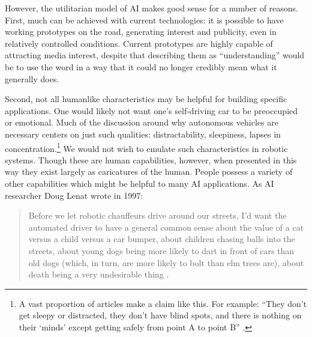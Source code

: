 


However, the utilitarian model of AI makes good sense for a number of reasons.
First, much can be achieved with current technologies:  it
is possible to have working prototypes on the road, generating
interest and publicity, even in relatively controlled conditions. Current
prototypes are highly capable of attracting media interest, despite
that describing them as 
``understanding'' would be to use the word in a way that it
could no longer credibly mean what it generally does. 

Second, not all humanlike characteristics may be helpful for building
specific applications. One would likely not want one's self-driving car
to be preoccupied or emotional. Much of the
discussion around why autonomous vehicles are necessary centers on
just such qualities: distractability, sleepiness, lapses in
concentration.\footnote{A vast proportion of articles make a claim
  like this. For example: ``They don't get sleepy or
  distracted, they don't have blind spots, and there is nothing on
  their `minds' except getting safely from point A to point B'' \cite{merrill}.} We
would not wish to emulate such 
characteristics in robotic systems. Though these are human
capabilities, however, when presented in this way they exist largely as caricatures
of the human. People possess a
variety of other capabilities which might be helpful to many AI
applications. As AI researcher Doug Lenat wrote in 1997:
\begin{quote}
Before we let robotic chauffeurs drive around our streets, I'd want the
  automated driver to have a general common sense about the value of a
cat versus a child versus a car bumper, about children chasing balls
into the streets, about young dogs being more likely to dart in front
of cars than old dogs (which, in turn, are more likely to bolt than
elm trees are), about death being a very undesirable thing \cite[p.
  199]{lenat1997}.\end{quote} 

